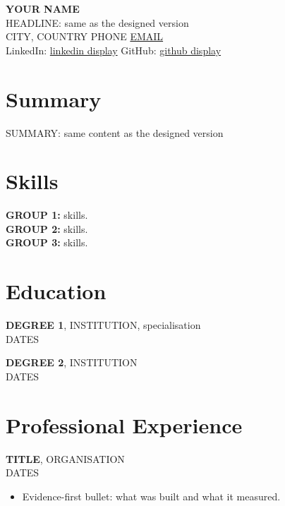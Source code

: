 \documentclass[11pt]{article}
\newcommand{\entry}[3]{\textbf{#1}, #2\\#3\par\vspace{1pt}}
\begin{document}
\begin{center}
  {\LARGE\textbf{{{YOUR NAME}}}}\\[2pt]
  {{HEADLINE: same as the designed version}}\\[3pt]
  {{CITY, COUNTRY}} \textbar{} {{PHONE}} \textbar{} \href{mailto:{{EMAIL}}}{{{EMAIL}}}\\
  LinkedIn: \href{{{LINKEDIN URL}}}{{{linkedin display}}} \textbar{} GitHub: \href{{{GITHUB URL}}}{{{github display}}}
\end{center}

\raggedright

\section{Summary}
{{SUMMARY: same content as the designed version}}

\section{Skills}
\textbf{{{GROUP 1}}:} {{skills}}.\\
\textbf{{{GROUP 2}}:} {{skills}}.\\
\textbf{{{GROUP 3}}:} {{skills}}.

\section{Education}
\entry{{{DEGREE 1}}}{{{INSTITUTION, specialisation}}}{{{DATES}}}
\entry{{{DEGREE 2}}}{{{INSTITUTION}}}{{{DATES}}}

\section{Professional Experience}

\entry{{{TITLE}}}{{{ORGANISATION}}}{{{DATES}}}
\begin{itemize}
  \item {{Evidence-first bullet: what was built and what it measured.}}
\end{itemize}
\end{document}
